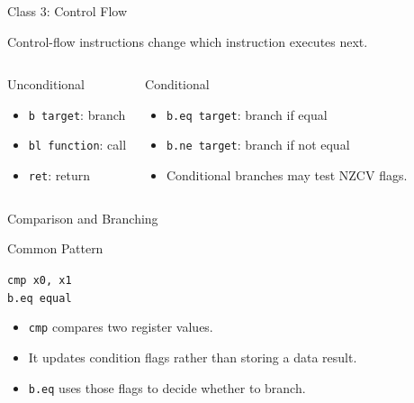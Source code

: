 \documentclass[aspectratio=169,11pt,t]{beamer}
\newcommand{\code}[1]{\texttt{#1}}
\begin{document}
\begin{frame}{Class 3: Control Flow}

Control-flow instructions
change which instruction executes next.

\vspace{0.15cm}

\begin{columns}[T,onlytextwidth]


\begin{block}{Unconditional}
\begin{itemize}
  \item \code{b target}:
        branch
  \item \code{bl function}:
        call
  \item \code{ret}:
        return
\end{itemize}
\end{block}


\begin{block}{Conditional}
\begin{itemize}
  \item \code{b.eq target}:
        branch if equal
  \item \code{b.ne target}:
        branch if not equal
  \item Conditional branches
        may test NZCV flags.
\end{itemize}
\end{block}

\end{columns}

\end{frame}




\begin{frame}{Comparison and Branching}

\begin{block}{Common Pattern}

\begin{center}
\large
\code{cmp x0, x1}\\[0.15cm]
\code{b.eq equal}
\end{center}

\end{block}

\vspace{0.15cm}

\begin{itemize}
  \item \code{cmp}
        compares two register values.
  \item It updates condition flags
        rather than storing a data result.
  \item \code{b.eq}
        uses those flags
        to decide whether to branch.
\end{itemize}

\end{frame}
\end{document}
